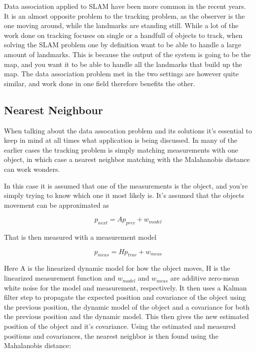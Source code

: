 Data association applied to SLAM have been more common in the recent years. It is an almost opposite problem to the tracking problem, as the observer is the one moving around, while the landmarks are standing still. While a lot of the work done on tracking focuses on single or a handfull of objects to track, when solving the SLAM problem one by definition want to be able to handle a large amount of landmarks. This is because the output of the system is going to be the map, and you want it to be able to handle all the landmarks that build up the map. The data association problem met in the two settings are however quite similar, and work done in one field therefore benefits the other. 

\subsection{Nearest Neighbour}

When talking about the data assocation problem and its solutions it's essential to keep in mind at all times what application is being discussed. In many of the earlier cases the tracking problem is simply matching measurements with one object, in which case a nearest neighbor matching with the Malahanobis distance can work wonders\cite{ShalomTracking}. 

In this case it is assumed that one of the measurements is the object, and you're simply trying to know which one it most likely is. It's assumed that the objects movement can be approximated as

\begin{equation}
    p_{next} = Ap_{prev} + w_{model}
\end{equation}

That is then measured with a measurement model

\begin{equation}
    p_{meas} = Hp_{true} + w_{meas}
\end{equation}
 
Here A is the linearized dynamic model for how the object moves, H is the linearized measurement function and $w_{model}$ and $w_{meas}$ are additive zero-mean white noise for the model and measurement, respectively. It then uses a Kalman filter step to propagate the expected position and covariance of the object using the previous position, the dynamic model of the object and a covariance for both the previous position and the dynamic model. This then gives the new estimated position of the object and it's covariance. Using the estimated and measured positions and covariances, the nearest neighbor is then found using the Mahalanobis distance\cite{MahalanobisTracking}:

